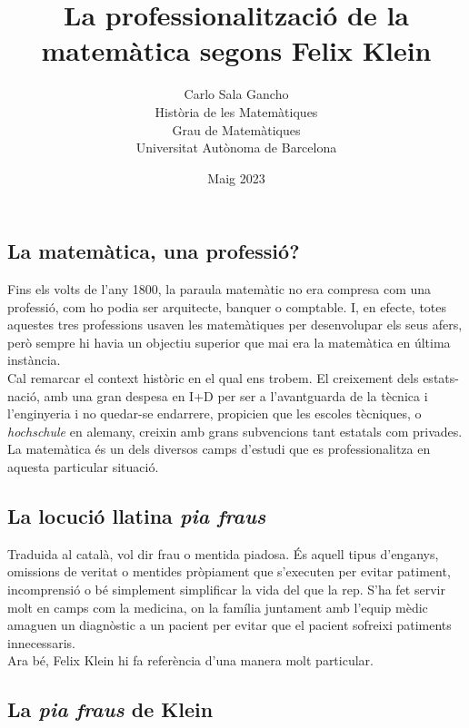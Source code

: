\documentclass[a4paper, 11pt]{article}
\title{La professionalització de la matemàtica segons Felix Klein}
\author{
  Carlo Sala Gancho\\
  Història de les Matemàtiques\\
  Grau de Matemàtiques\\
  Universitat Autònoma de Barcelona}
\date{Maig 2023}
\begin{document}
\maketitle

\subsection*{La matemàtica, una professió?}
Fins els volts de l'any 1800, la paraula matemàtic no era compresa com una professió, com ho podia ser arquitecte,
banquer o comptable. I, en efecte, totes aquestes tres professions usaven les matemàtiques per desenvolupar els seus
afers, però sempre hi havia un objectiu superior que mai era la matemàtica en última instància.\\
Cal remarcar el context històric en el qual ens trobem. El creixement dels estats-nació, amb una gran despesa en I+D
per ser a l'avantguarda de la tècnica i l'enginyeria i no quedar-se endarrere, propicien que les escoles tècniques, o
\textit{hochschule} en alemany, creixin amb grans subvencions tant estatals com privades. La matemàtica és un dels
diversos camps d'estudi que es professionalitza en aquesta particular situació.

\subsection*{La locució llatina \textit{pia fraus}}

Traduida al català, vol dir frau o mentida piadosa. És aquell tipus d'enganys, omissions de veritat o mentides
pròpiament que s'executen per evitar patiment, incomprensió o bé simplement simplificar la vida del que la rep. S'ha
fet servir molt en camps com la medicina, on la família juntament amb l'equip mèdic amaguen un diagnòstic a un pacient
per evitar que el pacient sofreixi patiments innecessaris.\\
Ara bé, Felix Klein hi fa referència d'una manera molt particular.

\subsection*{La \textit{pia fraus} de Klein}
\end{document}
